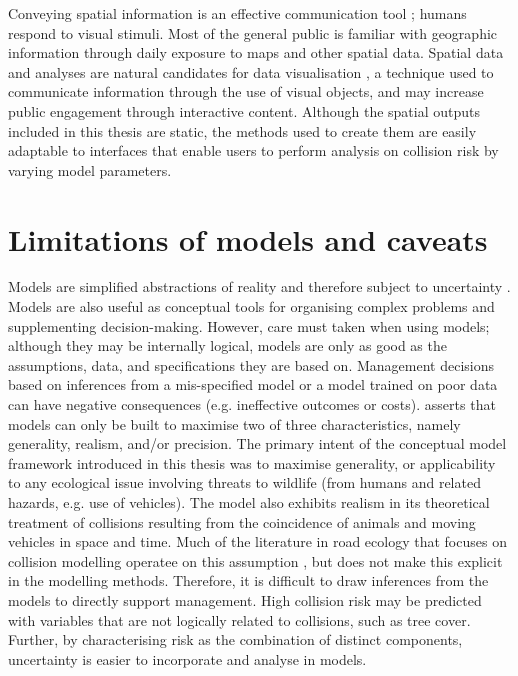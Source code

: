 
Conveying spatial information is an effective communication tool \citep{king00}; humans respond to visual stimuli. Most of the general public is familiar with geographic information through daily exposure to maps and other spatial data. Spatial data and analyses are natural candidates for data visualisation \citep{osul14}, a technique used to communicate information through the use of visual objects, and may increase public engagement through interactive content. Although the spatial outputs included in this thesis are static, the methods used to create them are easily adaptable to interfaces that enable users to perform analysis on collision risk by varying model parameters.

\section{Limitations of models and caveats}

Models are simplified abstractions of reality and therefore subject to uncertainty \citep{burg05}. Models are also useful as conceptual tools for organising complex problems and supplementing decision-making. However, care must taken when using models; although they may be internally logical, models are only as good as the assumptions, data, and specifications they are based on. Management decisions based on inferences from a mis-specified model or a model trained on poor data can have negative consequences (e.g. ineffective outcomes or costs). \cite{levi66} asserts that models can only be built to maximise two of three characteristics, namely generality, realism, and/or precision. The primary intent of the conceptual model framework introduced in this thesis was to maximise generality, or applicability to any ecological issue involving threats to wildlife (from humans and related hazards, e.g. use of vehicles). The model also exhibits realism in its theoretical treatment of collisions resulting from the coincidence of animals and moving vehicles in space and time. Much of the literature in road ecology that focuses on collision modelling operatee on this assumption \citep{form03,guns11}, but does not make this explicit in the modelling methods. Therefore, it is difficult to draw inferences from the models to directly support management. High collision risk may be predicted with variables that are not logically related to collisions, such as tree cover. Further, by characterising risk as the combination of distinct components, uncertainty is easier to incorporate and analyse in models. 

